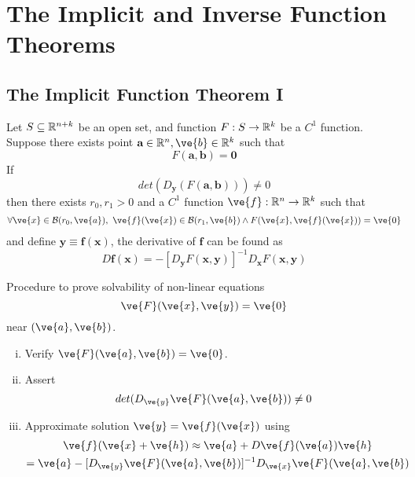 \documentclass[11pt]{article}
\begin{document}
	\section{The Implicit and Inverse Function Theorems}
		\subsection{The Implicit Function Theorem I}
			\begin{theorem}
				Let $S \subseteq \mathbb{R}^{n+k}$ be an open set, and function $F: S \to \mathbb{R}^k$ be a $C^1$ function. Suppose there exists point $\textbf{a} \in \R^n, \ve{b} \in \R^k$ such that 
				\begin{equation}
					F(\textbf{a}, \textbf{b}) = \textbf{0}
				\end{equation}
				If 
				\begin{equation}
					det(D_{\textbf{y}}(F(\textbf{a}, \textbf{b}))) \neq 0
				\end{equation}
				then there exists $r_0, r_1 > 0$ and a $C^1$ function $\ve{f}: \R^n \to \R^k$ such that
				\begin{gather}
					\forall \ve{x} \in \mc{B}(r_0, \ve{a}),\ \ve{f}(\ve{x}) \in \mc{B}(r_1, \ve{b}) \land F(\ve{x}, \ve{f}(\ve{x})) = \ve{0}
				\end{gather}
				and define $\textbf{y} \equiv \textbf{f}(\textbf{x})$, the derivative of $\textbf{f}$ can be found as
				\begin{equation}
					D\textbf{f}(\textbf{x}) = -[D_{\textbf{y}}F(\textbf{x}, \textbf{y})]^{-1} D_{\textbf{x}}F(\textbf{x}, \textbf{y})
				\end{equation}
			\end{theorem}
			\begin{remark}
				Procedure to prove solvability of non-linear equations
				\begin{equation}
					\ve{F}(\ve{x}, \ve{y}) = \ve{0}
				\end{equation}
				near $(\ve{a}, \ve{b})$.
				\begin{enumerate}[(i)]
					\item Verify $\ve{F}(\ve{a}, \ve{b}) = \ve{0}$.
					\item Assert
					\begin{equation}
						det(D_\ve{y}\ve{F}(\ve{a}, \ve{b})) \neq 0
					\end{equation}
					\item Approximate solution $\ve{y} = \ve{f}(\ve{x})$ using 
					\begin{gather}
						\ve{f}(\ve{x} + \ve{h}) \approx \ve{a} + D\ve{f}(\ve{a}) \ve{h} \\
						= \ve{a}
						- [D_\ve{y} \ve{F}(\ve{a}, \ve{b})]^{-1}
						D_\ve{x} \ve{F}(\ve{a}, \ve{b})
					\end{gather}
				\end{enumerate}
			\end{remark}
\end{document}
